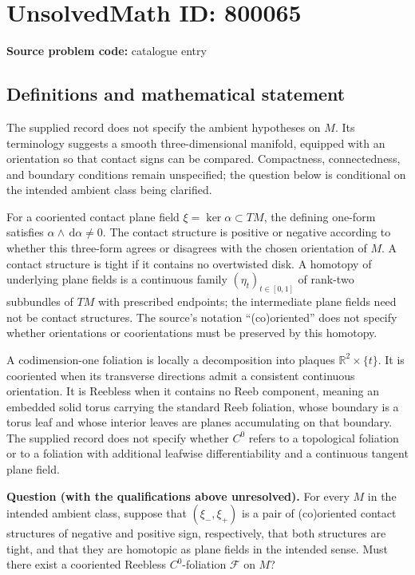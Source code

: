 \documentclass[11pt]{article}
\newcommand{\R}{\mathbb{R}}
\newcommand{\dd}{\,\mathrm{d}}
\begin{document}
\section*{UnsolvedMath ID: 800065}
\textbf{Source problem code:} catalogue entry
\subsection{Definitions and mathematical statement}
The supplied record does not specify the ambient hypotheses on \(M\). Its terminology suggests a smooth three-dimensional manifold, equipped with an orientation so that contact signs can be compared. Compactness, connectedness, and boundary conditions remain unspecified; the question below is conditional on the intended ambient class being clarified.

For a cooriented contact plane field \(\xi=\ker\alpha\subset TM\), the defining one-form satisfies \(\alpha\wedge\dd\alpha\ne0\). The contact structure is positive or negative according to whether this three-form agrees or disagrees with the chosen orientation of \(M\). A contact structure is tight if it contains no overtwisted disk. A homotopy of underlying plane fields is a continuous family \((\eta_t)_{t\in[0,1]}\) of rank-two subbundles of \(TM\) with prescribed endpoints; the intermediate plane fields need not be contact structures. The source's notation ``(co)oriented'' does not specify whether orientations or coorientations must be preserved by this homotopy.

A codimension-one foliation is locally a decomposition into plaques \(\R^2\times\{t\}\). It is cooriented when its transverse directions admit a consistent continuous orientation. It is Reebless when it contains no Reeb component, meaning an embedded solid torus carrying the standard Reeb foliation, whose boundary is a torus leaf and whose interior leaves are planes accumulating on that boundary. The supplied record does not specify whether \(C^0\) refers to a topological foliation or to a foliation with additional leafwise differentiability and a continuous tangent plane field.

\textbf{Question (with the qualifications above unresolved).} For every \(M\) in the intended ambient class, suppose that \((\xi_-,\xi_+)\) is a pair of (co)oriented contact structures of negative and positive sign, respectively, that both structures are tight, and that they are homotopic as plane fields in the intended sense. Must there exist a cooriented Reebless \(C^0\)-foliation \(\mathcal F\) on \(M\)?
\end{document}
